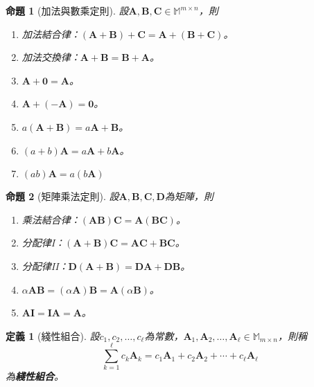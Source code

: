 \documentclass[12pt]{article}
\newtheorem{definition}{定義}
\newtheorem*{proposition}{命題}
\begin{document}
    \begin{proposition}[加法與數乘定則]
        設$\mathbf{A},\mathbf{B},\mathbf{C}\in\mathbb{M}^{m\times n}$，則\begin{enumerate}
            \item 加法結合律：$(\mathbf{A}+\mathbf{B})+\mathbf{C}=\mathbf{A}+(\mathbf{B}+\mathbf{C})$。
            \item 加法交換律：$\mathbf{A}+\mathbf{B}=\mathbf{B}+\mathbf{A}$。
            \item $\mathbf{A}+\mathbf{0}=\mathbf{A}$。
            \item $\mathbf{A}+(-\mathbf{A})=\mathbf{0}$。
            \item $a(\mathbf{A}+\mathbf{B})=a\mathbf{A}+\mathbf{B}$。
            \item $(a+b)\mathbf{A}=a\mathbf{A}+b\mathbf{A}$。
            \item $(ab)\mathbf{A}=a(b\mathbf{A})$
        \end{enumerate}
    \end{proposition}

    \begin{proposition}[矩陣乘法定則]
        設$\mathbf{A},\mathbf{B},\mathbf{C},\mathbf{D}$為矩陣，則\begin{enumerate}
            \item 乘法結合律：$(\mathbf{A}\mathbf{B})\mathbf{C}=\mathbf{A}(\mathbf{B}\mathbf{C})$。
            \item 分配律I：$(\mathbf{A}+\mathbf{B})\mathbf{C}=\mathbf{A}\mathbf{C}+\mathbf{B}\mathbf{C}$。
            \item 分配律II：$\mathbf{D}(\mathbf{A}+\mathbf{B})=\mathbf{D}\mathbf{A}+\mathbf{D}\mathbf{B}$。
            \item $\alpha\mathbf{A}\mathbf{B}=(\alpha\mathbf{A})\mathbf{B}=\mathbf{A}(\alpha\mathbf{B})$。
            \item $\mathbf{A}\mathbf{I}=\mathbf{I}\mathbf{A}=\mathbf{A}$。
        \end{enumerate}
    \end{proposition}
    
    \begin{definition}[綫性組合]
        設$c_1,c_2,\dots,c_\ell$為常數，$\mathbf{A}_1,\mathbf{A}_2,\dots,\mathbf{A}_\ell\in\mathbb{M}_{m\times n}$，則稱$$\sum_{k=1}^{\ell}c_k\mathbf{A}_k=c_1\mathbf{A}_1+c_2\mathbf{A}_2+\cdots+c_\ell\mathbf{A}_\ell$$為\textbf{綫性組合}。
    \end{definition}
\end{document}
